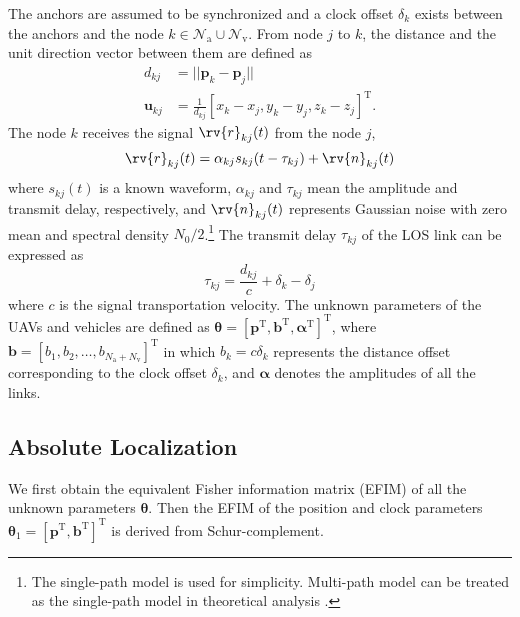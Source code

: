 \documentclass{IEEEtran}
\begin{document}
The anchors are assumed to be synchronized and a clock offset $\delta_k$ exists between the anchors and the node $k\in \mathcal{N}_{\text{a}} \cup \mathcal{N}_{\text{v}}$.
From node $j$ to $k$, the distance and the unit direction vector between them are defined as
\begin{equation}
\begin{aligned}
d_{kj}&=||\mathbf{p}_k-\mathbf{p}_j|| \\
\mathbf{u}_{kj}&=\frac{1}{d_{kj}}[x_k-x_j,y_k-y_j,z_k-z_j]^{\text{T}}.
\end{aligned}
\end{equation}
The node $k$ receives the signal $\rv{r}_{kj}(t)$ from the node $j$,
\begin{equation}
\rv{r}_{kj}(t)=\alpha_{kj}s_{kj}(t-\tau_{kj})+\rv{n}_{kj}(t)
\end{equation}
where $s_{kj}(t)$ is a known waveform, $\alpha_{kj}$ and $\tau_{kj}$ mean the amplitude and transmit delay, respectively, and $\rv{n}_{kj}(t)$ represents Gaussian noise with zero mean and spectral density $N_0/2$.\footnote{The single-path model is used for simplicity. Multi-path model can be treated as the single-path model in theoretical analysis \cite{SheWymWin:J10}.}
The transmit delay  $\tau_{kj}$ of the LOS link can be expressed as
\begin{equation}\label{eq38}
\tau_{kj}=\frac{d_{kj}}{c}+\delta_k-\delta_j
\end{equation}
where $c$ is the signal transportation velocity.
The unknown parameters of the UAVs and vehicles are defined as $\boldsymbol{\theta}=[\mathbf{p}^{\text{T}},\mathbf{b}^{\text{T}},\boldsymbol{\alpha}^{\text{T}}]^{\text{T}}$, where $\mathbf{b}=[b_1,b_2,\dots,b_{N_{\text{a}}+N_{\text{v}}}]^{\text{T}}$ in which $b_k=c\delta_k$ represents the distance offset corresponding to the clock offset $\delta_k$, and $\boldsymbol{\alpha}$ denotes the amplitudes of all the links.

\subsection{Absolute Localization}
We first obtain the equivalent Fisher information matrix (EFIM) of all the unknown parameters $\boldsymbol{\theta}$. Then the EFIM of the position and clock parameters $\boldsymbol{\theta}_1=[\mathbf{p}^{\text{T}},\mathbf{b}^{\text{T}}]^{\text{T}}$ is derived from Schur-complement.
\end{document}

